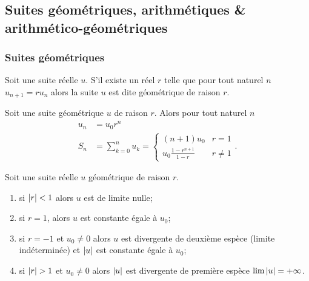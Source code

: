 \subsection{Suites géométriques, arithmétiques \& arithmético-géo\-métriques}

\subsubsection{Suites géométriques}

\begin{defdef}
  Soit une suite réelle \(u\). S'il existe un réel \(r\) telle que pour tout naturel \(n\) \(u_{n+1} = r u_n\) alors la suite \(u\) est dite géométrique de raison \(r\).
\end{defdef}
\begin{prop}
  Soit une suite géométrique \(u\) de raison \(r\). Alors pour tout naturel \(n\)
  \begin{align}
      u_n &= u_0 r^n \\ 
      S_n &=\sum_{k = 0}^n u_k = \begin{cases} (n+1) u_0 & r = 1 \\ u_0 \frac{1-r^{n+1}}{1-r} & r \neq 1 \end{cases}.
  \end{align}
\end{prop}
\begin{prop}
  Soit une suite réelle \(u\) géométrique de raison \(r\).
  \begin{enumerate}
  \item si \(\left\lvert r\right\rvert < 1\) alors \(u\) est de limite nulle;
  \item si \(r = 1\), alors \(u\) est constante égale à \(u_0\);
  \item si \(r = -1\) et \(u_0 \neq 0\) alors \(u\) est divergente de deuxième espèce (limite indéterminée) et \(\left\lvert u\right\rvert\) est constante égale à \(u_0\);
  \item si \(\left\lvert r\right\rvert>1\) et \(u_0 \neq 0\) alors \(\left\lvert u\right\rvert\) est divergente de première espèce \(\lim \left\lvert u\right\rvert = +\infty\).
  \end{enumerate}
\end{prop}

